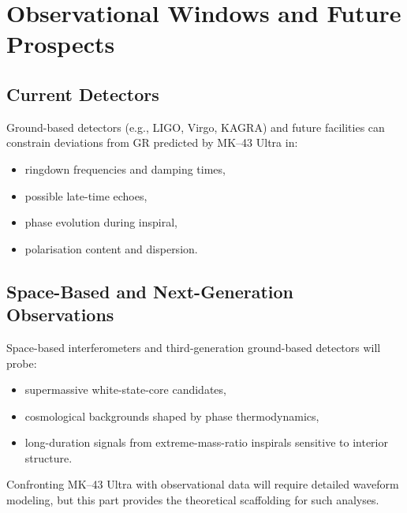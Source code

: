 \chapter{Observational Windows and Future Prospects}

\section{Current Detectors}

Ground-based detectors (e.g., LIGO, Virgo, KAGRA) and future facilities can constrain deviations from GR predicted by MK--43 Ultra in:
\begin{itemize}
  \item ringdown frequencies and damping times,
  \item possible late-time echoes,
  \item phase evolution during inspiral,
  \item polarisation content and dispersion.
\end{itemize}

\section{Space-Based and Next-Generation Observations}

Space-based interferometers and third-generation ground-based detectors will probe:
\begin{itemize}
  \item supermassive white-state-core candidates,
  \item cosmological backgrounds shaped by phase thermodynamics,
  \item long-duration signals from extreme-mass-ratio inspirals sensitive to interior structure.
\end{itemize}
Confronting MK--43 Ultra with observational data will require detailed waveform modeling, but this part provides the theoretical scaffolding for such analyses.
